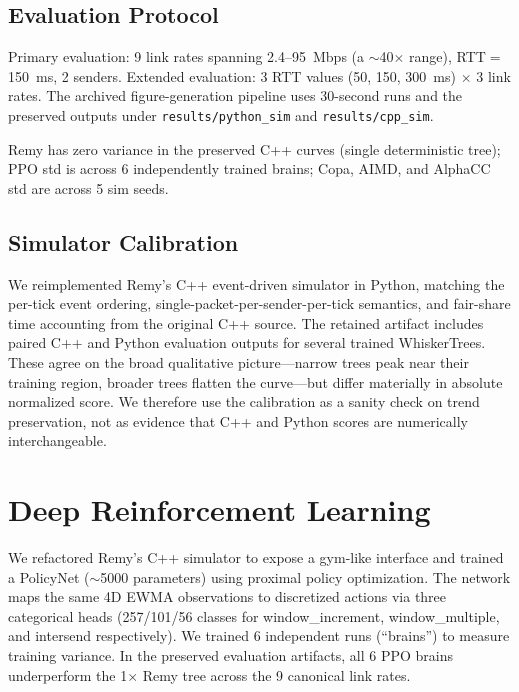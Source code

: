\subsection{Evaluation Protocol}

Primary evaluation: 9 link rates spanning 2.4--95~Mbps (a ${\sim}$40$\times$
range), RTT${}={}$150~ms, 2 senders. Extended evaluation: 3 RTT values (50,
150, 300~ms) $\times$ 3 link rates. The archived figure-generation pipeline
uses 30-second runs and the preserved outputs under \texttt{results/python\_sim}
and \texttt{results/cpp\_sim}.

Remy has zero variance in the preserved C++ curves (single deterministic
tree); PPO std is across 6 independently trained brains; Copa, AIMD, and
AlphaCC std are across 5 sim seeds.


\subsection{Simulator Calibration}
\label{sec:calibration}

We reimplemented Remy's C++ event-driven simulator in Python, matching the
per-tick event ordering, single-packet-per-sender-per-tick semantics, and
fair-share time accounting from the original C++ source. The retained artifact
includes paired C++ and Python evaluation outputs for several trained
WhiskerTrees. These agree on the broad qualitative picture---narrow trees peak
near their training region, broader trees flatten the curve---but differ
materially in absolute normalized score. We therefore use the calibration as a
sanity check on trend preservation, not as evidence that C++ and Python scores
are numerically interchangeable.


\section{Deep Reinforcement Learning}
\label{sec:deeprl}

We refactored Remy's C++ simulator to expose a gym-like interface and trained
a PolicyNet (${\sim}$5000 parameters) using proximal policy optimization.
The network maps the same 4D EWMA observations to discretized actions via
three categorical heads (257/101/56 classes for window\_increment,
window\_multiple, and intersend respectively). We trained 6 independent runs
(``brains'') to measure training variance. In the preserved evaluation
artifacts, all 6 PPO brains underperform the 1$\times$ Remy tree across the
9 canonical link rates.


